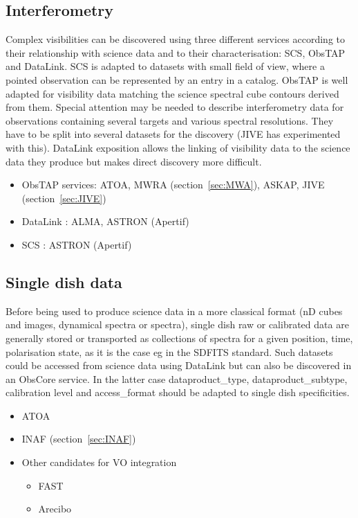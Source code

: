 \documentclass[11pt,a4paper]{ivoa}
\begin{document}
\subsection{Interferometry}
Complex visibilities can be discovered using three different services according to their relationship 
with science data and to their characterisation: SCS, ObsTAP and DataLink. SCS is adapted to datasets 
with small field of view, where a pointed observation can be
represented by an entry in a catalog. ObsTAP is well adapted for visibility data matching the science 
spectral cube contours derived from them. Special attention may be needed to describe interferometry 
data for observations containing several targets and various spectral resolutions. They have to be split 
into several datasets for the discovery (JIVE has experimented with this). DataLink exposition allows 
the linking of visibility data to the science data they produce but makes direct discovery more 
difficult. 
\begin{itemize}
\item ObsTAP services: ATOA, MWRA (section~\ref{sec:MWA}), ASKAP, JIVE (section~\ref{sec:JIVE})
\item DataLink : ALMA, ASTRON (Apertif)
\item SCS : ASTRON (Apertif)
\end{itemize}
\subsection{Single dish data}
Before being used to produce science data in a more classical format (nD cubes and images, dynamical 
spectra or spectra),  single dish  raw or calibrated data are generally stored or transported as 
collections of spectra for a given position, time, polarisation state, as it is the case eg in the 
SDFITS standard. Such datasets could be accessed from science data using DataLink but can also be 
discovered in an ObsCore service. In the latter case dataproduct\_type, dataproduct\_subtype, 
calibration level and access\_format should be adapted to single dish specificities.
\begin{itemize}
\item ATOA 
\item INAF (section~\ref{sec:INAF})
\item Other candidates for VO integration
\begin{itemize}
\item  FAST
\item Arecibo
\end{itemize}
\end{itemize}
\end{document}
